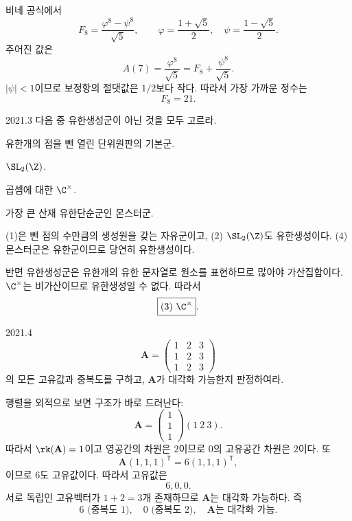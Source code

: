\begin{solution}
비네 공식에서
\[
F_8=\frac{\varphi^8-\psi^8}{\sqrt5},\qquad
\varphi=\frac{1+\sqrt5}{2},\quad
\psi=\frac{1-\sqrt5}{2}.
\]
주어진 값은
\[
A(7)=\frac{\varphi^8}{\sqrt5}=F_8+\frac{\psi^8}{\sqrt5}.
\]
$|\psi|<1$이므로 보정항의 절댓값은 $1/2$보다 작다. 따라서 가장 가까운 정수는
\[
\boxed{F_8=21}.
\]
\end{solution}

\begin{pastproblem}{2021.3}
다음 중 유한생성군이 아닌 것을 모두 고르라.
\begin{problemchoices}
\item 유한개의 점을 뺀 열린 단위원판의 기본군.
\item $\SL_2(\Z)$.
\item 곱셈에 대한 $\C^\times$.
\item 가장 큰 산재 유한단순군인 몬스터군.
\end{problemchoices}
\end{pastproblem}

\begin{solution}
(1)은 뺀 점의 수만큼의 생성원을 갖는 자유군이고, (2) $\SL_2(\Z)$도 유한생성이다. (4) 몬스터군은 유한군이므로 당연히 유한생성이다.

반면 유한생성군은 유한개의 유한 문자열로 원소를 표현하므로 많아야 가산집합이다. $\C^\times$는 비가산이므로 유한생성일 수 없다. 따라서
\[
\boxed{(3)\ \C^\times}.
\]
\end{solution}

\begin{pastproblem}{2021.4}
\[
\mathbf A=
\begin{pmatrix}
1&2&3\\
1&2&3\\
1&2&3
\end{pmatrix}
\]
의 모든 고유값과 중복도를 구하고, $\mathbf A$가 대각화 가능한지 판정하여라.
\end{pastproblem}

\begin{solution}
행렬을 외적으로 보면 구조가 바로 드러난다:
\[
\mathbf A=
\begin{pmatrix}1\\1\\1\end{pmatrix}(1\ 2\ 3).
\]
따라서 $\rk(\mathbf A)=1$이고 영공간의 차원은 $2$이므로 $0$의 고유공간 차원은 $2$이다. 또
\[
\mathbf A(1,1,1)^{\mathsf T}=6(1,1,1)^{\mathsf T},
\]
이므로 $6$도 고유값이다. 따라서 고유값은
\[
6,0,0.
\]
서로 독립인 고유벡터가 $1+2=3$개 존재하므로 $\mathbf A$는 대각화 가능하다. 즉
\[
\boxed{6\text{ (중복도 }1),\quad0\text{ (중복도 }2),\quad\mathbf A\text{는 대각화 가능}}.
\]
\end{solution}

